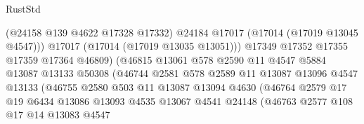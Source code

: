 \begin{lexlean}{RustStd}
\begin{coremodule}
                                        (@24158 @139 @4622 @17328 @17332)
                                        @24184
                                        @17017
                                        (@17014 (@17019 @13045 @4547)))
                                      @17017
                                      (@17014 (@17019 @13035 @13051)))
                                    @17349
                                    @17352
                                    @17355
                                    @17359
                                    @17364
                                    @46809)
                                  (@46815
                                    @13061
                                    @578
                                    @2590
                                    @11
                                    @4547
                                    @5884
                                    @13087
                                    @13133
                                    @50308
                                    (@46744
                                      @2581
                                      @578
                                      @2589
                                      @11
                                      @13087
                                      @13096
                                      @4547
                                      @13133
                                      (@46755
                                        @2580
                                        @503
                                        @11
                                        @13087
                                        @13094
                                        @4630
                                        (@46764
                                          @2579
                                          @17
                                          @19
                                          @6434
                                          @13086
                                          @13093
                                          @4535
                                          @13067
                                          @4541
                                          @24148
                                          (@46763
                                            @2577
                                            @108
                                            @17
                                            @14
                                            @13083
                                            @4547

\end{coremodule}
\end{lexlean}
